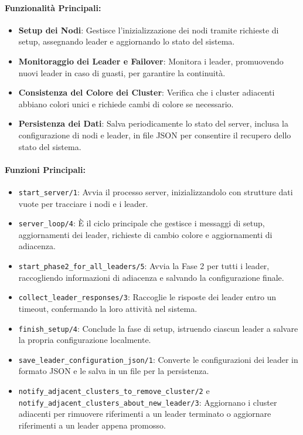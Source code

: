 \documentclass[12pt, a4paper]{report}
\begin{document}
\paragraph{Funzionalità Principali:}
\begin{itemize}
    \item \textbf{Setup dei Nodi}: Gestisce l'inizializzazione dei nodi tramite richieste di setup, assegnando leader e aggiornando lo stato del sistema.
    \item \textbf{Monitoraggio dei Leader e Failover}: Monitora i leader, promuovendo nuovi leader in caso di guasti, per garantire la continuità.
    \item \textbf{Consistenza del Colore dei Cluster}: Verifica che i cluster adiacenti abbiano colori unici e richiede cambi di colore se necessario.
    \item \textbf{Persistenza dei Dati}: Salva periodicamente lo stato del server, inclusa la configurazione di nodi e leader, in file JSON per consentire il recupero dello stato del sistema.
\end{itemize}

\paragraph{Funzioni Principali:}
\begin{itemize}
    \item \texttt{start\_server/1}: Avvia il processo server, inizializzandolo con strutture dati vuote per tracciare i nodi e i leader.
    \item \texttt{server\_loop/4}: È il ciclo principale che gestisce i messaggi di setup, aggiornamenti dei leader, richieste di cambio colore e aggiornamenti di adiacenza.
    \item \texttt{start\_phase2\_for\_all\_leaders/5}: Avvia la Fase 2 per tutti i leader, raccogliendo informazioni di adiacenza e salvando la configurazione finale.
    \item \texttt{collect\_leader\_responses/3}: Raccoglie le risposte dei leader entro un timeout, confermando la loro attività nel sistema.
    \item \texttt{finish\_setup/4}: Conclude la fase di setup, istruendo ciascun leader a salvare la propria configurazione localmente.
    \item \texttt{save\_leader\_configuration\_json/1}: Converte le configurazioni dei leader in formato JSON e le salva in un file per la persistenza.
    \item \texttt{notify\_adjacent\_clusters\_to\_remove\_cluster/2} e \\ \texttt{notify\_adjacent\_clusters\_about\_new\_leader/3}: Aggiornano i cluster adiacenti per rimuovere riferimenti a un leader terminato o aggiornare riferimenti a un leader appena promosso.
\end{itemize}
\end{document}
